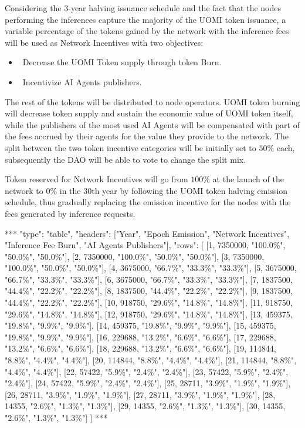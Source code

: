 \documentclass{article}
\begin{document}
Considering the 3-year halving issuance schedule and the fact that the nodes performing the inferences capture the majority of the UOMI token issuance, a variable percentage of the tokens gained by the network with the inference fees will be used as Network Incentives with two objectives: 
\begin{itemize}
\item \ Decrease the UOMI Token supply through token Burn.
\item \ Incentivize AI Agents publishers.
\end{itemize}

The rest of the tokens will be distributed to node operators. UOMI token burning will decrease token supply and sustain the economic value of UOMI token itself, while the publishers of the most used AI Agents will be compensated with part of the fees accrued by their agents for the value they provide to the network. The split between the two token incentive categories will be initially set to \( 50\%\) each, subsequently the DAO will be able to vote to change the split mix.

Token reserved for Network Incentives will go from \( 100\%\) at the launch of the network to \( 0\%\) in the 30th year by following the UOMI token halving emission schedule, thus gradually replacing the emission incentive for the nodes with the fees generated by inference requests. 

\begin{center}
***
"type": "table",
"headers": ["Year", "Epoch Emission", "Network Incentives", "Inference Fee Burn", "AI Agents Publishers"],
"rows": [
  [1, 7350000, "100.0\%", "50.0\%", "50.0\%"],
  [2, 7350000, "100.0\%", "50.0\%", "50.0\%"],
  [3, 7350000, "100.0\%", "50.0\%", "50.0\%"],
  [4, 3675000, "66.7\%", "33.3\%", "33.3\%"],
  [5, 3675000, "66.7\%", "33.3\%", "33.3\%"],
  [6, 3675000, "66.7\%", "33.3\%", "33.3\%"],
  [7, 1837500, "44.4\%", "22.2\%", "22.2\%"],
  [8, 1837500, "44.4\%", "22.2\%", "22.2\%"],
  [9, 1837500, "44.4\%", "22.2\%", "22.2\%"],
  [10, 918750, "29.6\%", "14.8\%", "14.8\%"],
  [11, 918750, "29.6\%", "14.8\%", "14.8\%"],
  [12, 918750, "29.6\%", "14.8\%", "14.8\%"],
  [13, 459375, "19.8\%", "9.9\%", "9.9\%"],
  [14, 459375, "19.8\%", "9.9\%", "9.9\%"],
  [15, 459375, "19.8\%", "9.9\%", "9.9\%"],
  [16, 229688, "13.2\%", "6.6\%", "6.6\%"],
  [17, 229688, "13.2\%", "6.6\%", "6.6\%"],
  [18, 229688, "13.2\%", "6.6\%", "6.6\%"],
  [19, 114844, "8.8\%", "4.4\%", "4.4\%"],
  [20, 114844, "8.8\%", "4.4\%", "4.4\%"],
  [21, 114844, "8.8\%", "4.4\%", "4.4\%"],
  [22, 57422, "5.9\%", "2.4\%", "2.4\%"],
  [23, 57422, "5.9\%", "2.4\%", "2.4\%"],
  [24, 57422, "5.9\%", "2.4\%", "2.4\%"],
  [25, 28711, "3.9\%", "1.9\%", "1.9\%"],
  [26, 28711, "3.9\%", "1.9\%", "1.9\%"],
  [27, 28711, "3.9\%", "1.9\%", "1.9\%"],
  [28, 14355, "2.6\%", "1.3\%", "1.3\%"],
  [29, 14355, "2.6\%", "1.3\%", "1.3\%"],
  [30, 14355, "2.6\%", "1.3\%", "1.3\%"]
]
***
\end{center}
\end{document}
